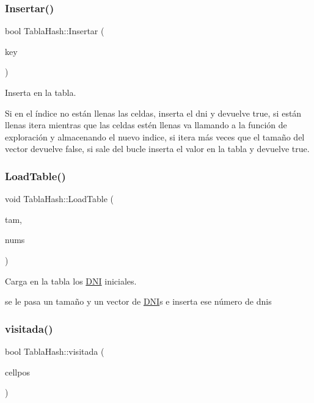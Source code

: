 \subsubsection{\texorpdfstring{Insertar()}{Insertar()}}
{\footnotesize\ttfamily bool Tabla\+Hash\+::\+Insertar (\begin{DoxyParamCaption}\item[{\hyperlink{classDNI}{D\+NI} \&}]{key }\end{DoxyParamCaption})}



Inserta en la tabla. 

Si en el índice no están llenas las celdas, inserta el dni y devuelve true, si están llenas itera mientras que las celdas estén llenas va llamando a la función de exploración y almacenando el nuevo indice, si itera más veces que el tamaño del vector devuelve false, si sale del bucle inserta el valor en la tabla y devuelve true. \mbox{\label{classTablaHash_ad936073d56db493bc327aee20ab30769}} 
\subsubsection{\texorpdfstring{Load\+Table()}{LoadTable()}}
{\footnotesize\ttfamily void Tabla\+Hash\+::\+Load\+Table (\begin{DoxyParamCaption}\item[{int}]{tam,  }\item[{vector$<$ \hyperlink{classDNI}{D\+NI} $>$ \&}]{nums }\end{DoxyParamCaption})}



Carga en la tabla los \hyperlink{classDNI}{D\+NI} iniciales. 

se le pasa un tamaño y un vector de \hyperlink{classDNI}{D\+NI}\textquotesingle{}s e inserta ese número de dni\textquotesingle{}s \mbox{\label{classTablaHash_ae6ff3c4b4dce04e4eac89ba63dfc6faa}} 
\subsubsection{\texorpdfstring{visitada()}{visitada()}}
{\footnotesize\ttfamily bool Tabla\+Hash\+::visitada (\begin{DoxyParamCaption}\item[{int}]{cellpos }\end{DoxyParamCaption})}



